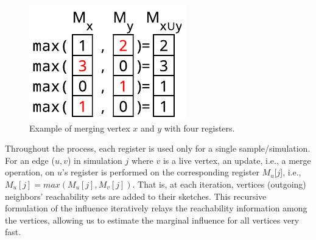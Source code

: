 \begin{figure}
    \begin{center}
      \includegraphics[width=1\linewidth]{images/fmmerge.pdf}
    \end{center}
    \caption{Example of merging vertex $x$ and $y$ with four registers.}
  \end{figure}
Throughout the process, each register is used only for a single sample/simulation. 
For an edge ($u, v$) in simulation $j$ where $v$ is a live vertex, an update, i.e., a merge operation, on $u$'s register is performed on the corresponding register $M_u$[$j$], i.e., $M_u[j] = max(M_u[j],M_v[j])$.
That is, at each iteration, vertices (outgoing) neighbors' reachability sets are added to their sketches.
This recursive formulation of the influence iteratively relays the reachability information among the vertices, allowing us to estimate the marginal influence for all vertices very fast.

